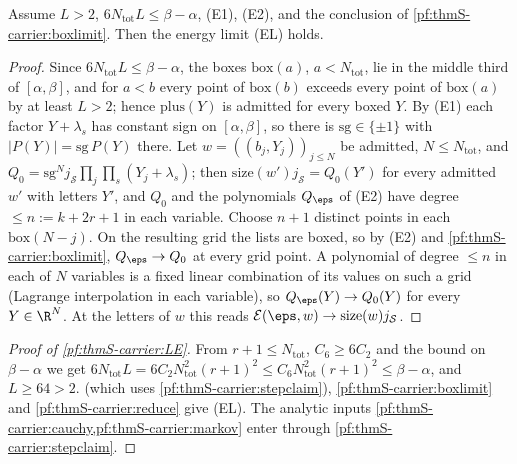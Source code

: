 \begin{lemma}\label{pf:thmS-carrier:reduce}
Assume $L>2$, $6N_{\mathrm{tot}}L\le\beta-\alpha$, (E1), (E2), and the conclusion of \cref{pf:thmS-carrier:boxlimit}. Then the
energy limit (EL) holds.
\end{lemma}

\begin{proof}
Since $6N_{\mathrm{tot}}L\le\beta-\alpha$, the boxes $\mathrm{box}(a)$, $a<N_{\mathrm{tot}}$, lie in the middle third of
$[\alpha,\beta]$, and for $a<b$ every point of $\mathrm{box}(b)$ exceeds every point of $\mathrm{box}(a)$ by at least $L>2$;
hence $\mathrm{plus}(Y)$ is admitted for every boxed $Y$. By (E1) each factor $Y+\lambda_s$ has constant sign on $[\alpha,
\beta]$, so there is $\mathrm{sg}\in\{\pm1\}$ with $|P(Y)|=\mathrm{sg}\,P(Y)$ there. Let $w=((b_j,Y_j))_{j\le N}$ be admitted,
$N\le N_{\mathrm{tot}}$, and $Q_0=\mathrm{sg}^Nj_{\mathcal S}\prod_j\prod_s(Y_j+\lambda_s)$; then $\mathrm{size}(w')j_{\mathcal
S}=Q_0(Y')$ for every admitted $w'$ with letters $Y'$, and $Q_0$ and the polynomials $Q_\eps$ of (E2) have degree $\le
n:=k+2r+1$ in each variable. Choose $n+1$ distinct points in each $\mathrm{box}(N-j)$. On the resulting grid the lists are
boxed, so by (E2) and \cref{pf:thmS-carrier:boxlimit}, $Q_\eps\to Q_0$ at every grid point. A polynomial of degree $\le n$ in
each of $N$ variables is a fixed linear combination of its values on such a grid (Lagrange interpolation in each variable), so
$Q_\eps(Y)\to Q_0(Y)$ for every $Y\in\R^N$. At the letters of $w$ this reads $\thmScarrierEn(\eps,w)\to\mathrm{size}(w)
j_{\mathcal S}$.
\end{proof}

\begin{proof}[Proof of \cref{pf:thmS-carrier:LE}]
From $r+1\le N_{\mathrm{tot}}$, $C_6\ge6C_2$ and the bound on $\beta-\alpha$ we get $6N_{\mathrm{tot}}L=6C_2N_{\mathrm{tot}}^2
(r+1)^2\le C_6N_{\mathrm{tot}}^2(r+1)^2\le\beta-\alpha$, and $L\ge64>2$.  (which uses
\cref{pf:thmS-carrier:stepclaim}), \cref{pf:thmS-carrier:boxlimit} and \cref{pf:thmS-carrier:reduce} give (EL). The analytic
inputs \cref{pf:thmS-carrier:cauchy,pf:thmS-carrier:markov} enter through \cref{pf:thmS-carrier:stepclaim}.
\end{proof}

